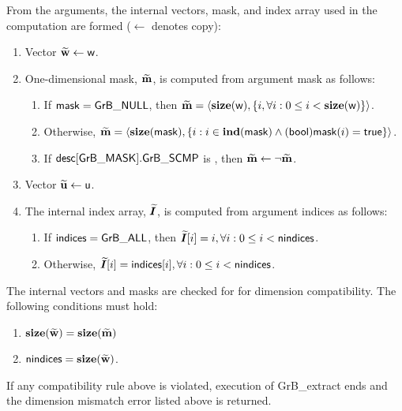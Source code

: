 From the arguments, the internal vectors, mask, and index array used in 
the computation are formed ($\leftarrow$ denotes copy):
\begin{enumerate}
	\item Vector ${\bf \widetilde{w}} \leftarrow {\sf w}$.

	\item One-dimensional mask, ${\bf \widetilde{m}}$, is computed from 
    argument {\sf mask} as follows:
	\begin{enumerate}
		\item	If ${\sf mask} = {\sf GrB\_NULL}$, then ${\bf \widetilde{m}} = 
        \langle \bold{size}({\sf w}), \{i, \forall i : 0 \leq i < 
        \bold{size}({\sf w}) \} \rangle$.

		\item	Otherwise, ${\bf \widetilde{m}} = 
        \langle \bold{size}({\sf mask}), \{i :  i \in \bold{ind}({\sf mask}) \wedge
        ({\sf bool}){\sf mask}(i) = {\sf true} \} \rangle$.

		\item	If ${\sf desc[GrB\_MASK].GrB\_SCMP}$ is \true, then 
        ${\bf \widetilde{m}} \leftarrow \neg {\bf \widetilde{m}}$.
	\end{enumerate}

	\item Vector ${\bf \widetilde{u}} \leftarrow {\sf u}$.
    
    \item The internal index array, $\bm{\widetilde{I}}$, is computed from 
    argument {\sf indices} as follows:
	\begin{enumerate}
		\item	If ${\sf indices} = {\sf GrB\_ALL}$, then 
        $\bm{\widetilde{I}}[i] = i, \forall i : 0 \leq i < {\sf nindices}$.

		\item	Otherwise, $\bm{\widetilde{I}}[i] = {\sf indices}[i], 
        \forall i : 0 \leq i < {\sf nindices}$.
    \end{enumerate}
\end{enumerate}

The internal vectors and masks are checked for for dimension compatibility. 
The following conditions must hold:
\begin{enumerate}
	\item $\bold{size}({\bf \widetilde{w}}) = \bold{size}({\bf \widetilde{m}})$
    \item ${\sf nindices} = \bold{size}({\bf \widetilde{w}})$.
\end{enumerate}
If any compatibility rule above is violated, execution of {\sf GrB\_extract} ends and 
the dimension mismatch error listed above is returned.

